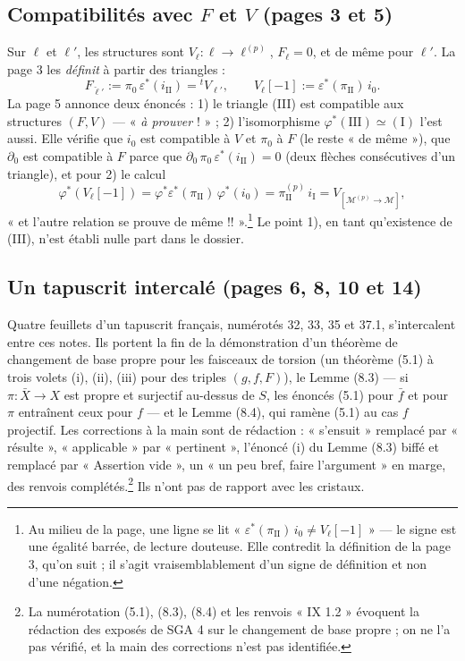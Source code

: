 \documentclass[11pt,a4paper]{article}
\begin{document}
\subsection*{Compatibilités avec $F$ et $V$ (pages 3 et 5)}

Sur $\ell$ et $\ell'$, les structures sont $V_{\ell}\colon \ell \to
\ell^{(p)}$, $F_{\ell} = 0$, et de même pour $\ell'$. La page 3 les
\emph{définit} à partir des triangles :
\[
F_{\check\ell'} := \pi_{0}\,\varepsilon^{*}(i_{\mathrm{II}}) = {}^{t}V_{\ell'},
\qquad
V_{\ell}[-1] := \varepsilon^{*}(\pi_{\mathrm{II}})\, i_{0}.
\]
La page 5 annonce deux énoncés : 1) le triangle (III) est compatible aux
structures $(F, V)$ — « \emph{à prouver} ! » ; 2) l'isomorphisme
$\varphi^{*}(\mathrm{III}) \simeq (\mathrm{I})$ l'est aussi. Elle vérifie
que $i_{0}$ est compatible à $V$ et $\pi_{0}$ à $F$ (le reste « de même »),
que $\partial_{0}$ est compatible à $F$ parce que
$\partial_{0}\,\pi_{0}\,\varepsilon^{*}(i_{\mathrm{II}}) = 0$ (deux flèches
consécutives d'un triangle), et pour 2) le calcul
\[
\varphi^{*}(V_{\ell}[-1]) = \varphi^{*}\varepsilon^{*}(\pi_{\mathrm{II}})\,
\varphi^{*}(i_{0}) = \pi_{\mathrm{II}}^{(p)}\, i_{\mathrm{I}}
= V_{[\mathcal{M}^{(p)} \to \mathcal{M}]},
\]
« et l'autre relation se prouve de même !! ».\footnote{Au milieu de la page,
une ligne se lit « $\varepsilon^{*}(\pi_{\mathrm{II}})\,i_{0} \ne
V_{\ell}[-1]$ » — le signe est une égalité barrée, de lecture douteuse. Elle
contredit la définition de la page 3, qu'on suit ; il s'agit vraisemblablement
d'un signe de définition et non d'une négation.} Le point 1), en tant
qu'existence de (III), n'est établi nulle part dans le dossier.

\subsection*{Un tapuscrit intercalé (pages 6, 8, 10 et 14)}

Quatre feuillets d'un tapuscrit français, numérotés 32, 33, 35 et 37.1,
s'intercalent entre ces notes. Ils portent la fin de la démonstration d'un
théorème de changement de base propre pour les faisceaux de torsion (un
théorème (5.1) à trois volets (i), (ii), (iii) pour des triples
$(g, f, F)$), le Lemme (8.3) — si $\pi\colon \bar X \to X$ est propre et
surjectif au-dessus de $S$, les énoncés (5.1) pour $\bar f$ et pour $\pi$
entraînent ceux pour $f$ — et le Lemme (8.4), qui ramène (5.1) au cas $f$
projectif. Les corrections à la main sont de rédaction : « s'ensuit »
remplacé par « résulte », « applicable » par « pertinent », l'énoncé (i) du
Lemme (8.3) biffé et remplacé par « Assertion vide », un « un peu bref, faire
l'argument » en marge, des renvois complétés.\footnote{La numérotation
(5.1), (8.3), (8.4) et les renvois « IX 1.2 » évoquent la rédaction des
exposés de SGA 4 sur le changement de base propre ; on ne l'a pas vérifié, et
la main des corrections n'est pas identifiée.} Ils n'ont pas de rapport avec
les cristaux.
\end{document}
